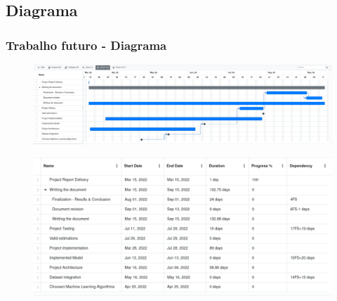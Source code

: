 \documentclass{beamer}
\begin{document}
\subsection{Diagrama}
\begin{frame}
\frametitle{Trabalho futuro - Diagrama}

\begin{center}
	\begin{figure}[H]
		\begin{center}
			\includegraphics[scale=0.16]{./figures/planning_tiny1.pdf}
		\end{center}
	\end{figure}
\end{center}


\begin{figure}[H]
    \begin{center}
        \includegraphics[scale=0.20]{./figures/planning_tiny2.pdf}
    \end{center}
\end{figure}

\end{frame}
\end{document}
